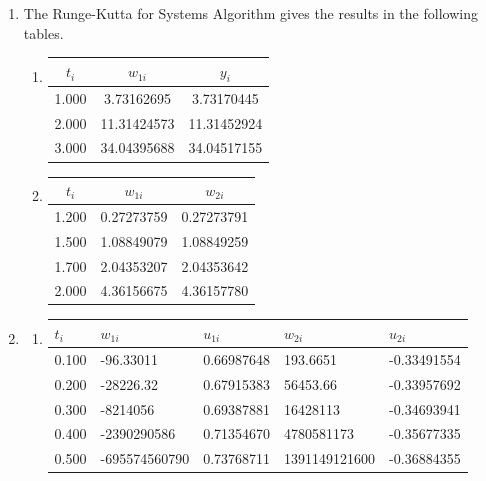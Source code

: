 \begin{posttest}
\begin{mysolution}
\begin{enumerate}[label=\arabic*.]
\vspace{5mm}
\item The Runge-Kutta for Systems Algorithm gives the results in the following tables.\\
\begin{enumerate}[label=(\alph*).]
\item

\begin{center}
\begin{tabular}{ccc}
\hline
$t_{i}$ & $w_{1 i}$ & $y_{i}$ \\
\hline
1.000 & 3.73162695 & 3.73170445 \\
2.000 & 11.31424573 & 11.31452924 \\
3.000 & 34.04395688 & 34.04517155 \\
\hline
\end{tabular}
\end{center}

\item

\begin{center}
\begin{tabular}{ccc}
\hline
$t_{i}$ & $w_{1 i}$ & $w_{2 i}$ \\
\hline
1.200 & 0.27273759 & 0.27273791 \\
1.500 & 1.08849079 & 1.08849259 \\
1.700 & 2.04353207 & 2.04353642 \\
2.000 & 4.36156675 & 4.36157780 \\
\hline
\end{tabular}
\end{center}

\end{enumerate}

\vspace{5mm}
\item 
\begin{enumerate}[label=(\alph*).]
\item
\begin{center}
\begin{tabular}{|l|l|l|l|l|}
\hline
$t_{i}$ & $w_{1 i}$ & $u_{1 i}$ & $w_{2 i}$ & $u_{2 i}$ \\
\hline
0.100 & -96.33011 & 0.66987648 & 193.6651 & -0.33491554 \\
\hline
0.200 & -28226.32 & 0.67915383 & 56453.66 & -0.33957692 \\
\hline
0.300 & -8214056 & 0.69387881 & 16428113 & -0.34693941 \\
\hline
0.400 & -2390290586 & 0.71354670 & 4780581173 & -0.35677335 \\
\hline
0.500 & -695574560790 & 0.73768711 & 1391149121600 & -0.36884355 \\
\hline
\end{tabular}
\end{center}


\end{enumerate}
\end{enumerate}
\end{mysolution}
\end{posttest}

